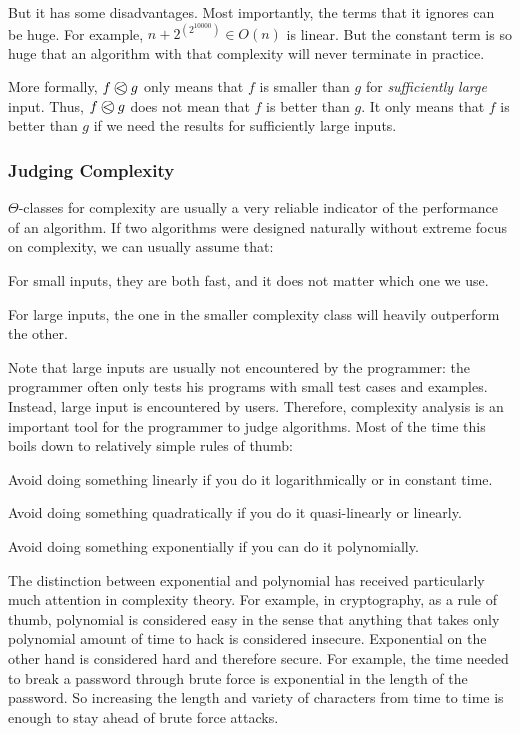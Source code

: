 But it has some disadvantages.
Most importantly, the terms that it ignores can be huge.
For example, $n+2^{(2^10000)}\in O(n)$ is linear.
But the constant term is so huge that an algorithm with that complexity will never terminate in practice.

More formally, $\Oleq{f}{g}$ only means that $f$ is smaller than $g$ for \emph{sufficiently large} input.
Thus, $\Oleq{f}{g}$ does not mean that $f$ is better than $g$.
It only means that $f$ is better than $g$ if we need the results for sufficiently large inputs.

\subsubsection{Judging Complexity}

$\Theta$-classes for complexity are usually a very reliable indicator of the performance of an algorithm.
If two algorithms were designed naturally without extreme focus on complexity, we can usually assume that:
\begin{compactitem}
 \item For small inputs, they are both fast, and it does not matter which one we use.
 \item For large inputs, the one in the smaller complexity class will heavily outperform the other.
\end{compactitem}

Note that large inputs are usually not encountered by the programmer: the programmer often only tests his programs with small test cases and examples.
Instead, large input is encountered by users.
Therefore, complexity analysis is an important tool for the programmer to judge algorithms.
Most of the time this boils down to relatively simple rules of thumb:
\begin{compactitem} 
 \item Avoid doing something linearly if you do it logarithmically or in constant time.
 \item Avoid doing something quadratically if you do it quasi-linearly or linearly.
 \item Avoid doing something exponentially if you can do it polynomially.
\end{compactitem}

The distinction between exponential and polynomial has received particularly much attention in complexity theory.
For example, in cryptography, as a rule of thumb, polynomial is considered easy in the sense that anything that takes only polynomial amount of time to hack is considered insecure.
Exponential on the other hand is considered hard and therefore secure.
For example, the time needed to break a password through brute force is exponential in the length of the password.
So increasing the length and variety of characters from time to time is enough to stay ahead of brute force attacks.

